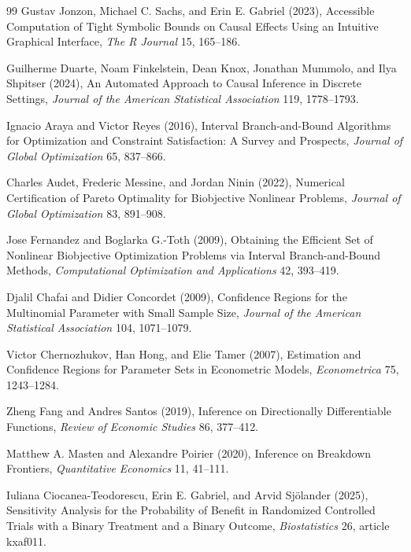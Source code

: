 \documentclass{article}
\begin{document}
\begin{thebibliography}{99}
   Gustav Jonzon, Michael C. Sachs, and Erin E. Gabriel (2023), Accessible Computation of Tight Symbolic Bounds on Causal Effects Using an Intuitive Graphical Interface, \emph{The R Journal} 15, 165--186.

   Guilherme Duarte, Noam Finkelstein, Dean Knox, Jonathan Mummolo, and Ilya Shpitser (2024), An Automated Approach to Causal Inference in Discrete Settings, \emph{Journal of the American Statistical Association} 119, 1778--1793.

   Ignacio Araya and Victor Reyes (2016), Interval Branch-and-Bound Algorithms for Optimization and Constraint Satisfaction: A Survey and Prospects, \emph{Journal of Global Optimization} 65, 837--866.

   Charles Audet, Frederic Messine, and Jordan Ninin (2022), Numerical Certification of Pareto Optimality for Biobjective Nonlinear Problems, \emph{Journal of Global Optimization} 83, 891--908.

   Jose Fernandez and Boglarka G.-Toth (2009), Obtaining the Efficient Set of Nonlinear Biobjective Optimization Problems via Interval Branch-and-Bound Methods, \emph{Computational Optimization and Applications} 42, 393--419.

   Djalil Chafai and Didier Concordet (2009), Confidence Regions for the Multinomial Parameter with Small Sample Size, \emph{Journal of the American Statistical Association} 104, 1071--1079.

   Victor Chernozhukov, Han Hong, and Elie Tamer (2007), Estimation and Confidence Regions for Parameter Sets in Econometric Models, \emph{Econometrica} 75, 1243--1284.

   Zheng Fang and Andres Santos (2019), Inference on Directionally Differentiable Functions, \emph{Review of Economic Studies} 86, 377--412.

   Matthew A. Masten and Alexandre Poirier (2020), Inference on Breakdown Frontiers, \emph{Quantitative Economics} 11, 41--111.

   Iuliana Ciocanea-Teodorescu, Erin E. Gabriel, and Arvid Sjölander (2025), Sensitivity Analysis for the Probability of Benefit in Randomized Controlled Trials with a Binary Treatment and a Binary Outcome, \emph{Biostatistics} 26, article kxaf011.

\end{thebibliography}
\end{document}
